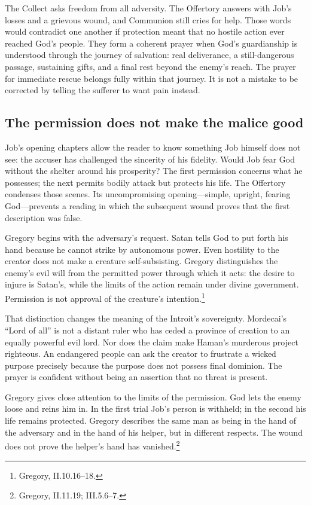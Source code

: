 
The Collect asks freedom from all adversity. The Offertory answers with
Job's losses and a grievous wound, and Communion still cries for help.
Those words would contradict one another if protection meant that no
hostile action ever reached God's people. They form a coherent prayer
when God's guardianship is understood through the journey of salvation:
real deliverance, a still-dangerous passage, sustaining gifts, and a
final rest beyond the enemy's reach. The prayer for immediate rescue
belongs fully within that journey. It is not a mistake to be corrected
by telling the sufferer to want pain instead.

\subsection{The permission does not make the malice good}
Job's opening chapters allow the reader to know something Job himself
does not see: the accuser has challenged the sincerity of his fidelity.
Would Job fear God without the shelter around his prosperity? The first
permission concerns what he possesses; the next permits bodily attack
but protects his life. The Offertory condenses those scenes. Its
uncompromising opening---simple, upright, fearing God---prevents a
reading in which the subsequent wound proves that the first description
was false.

Gregory begins with the adversary's request. Satan tells God to put
forth his hand because he cannot strike by autonomous power. Even
hostility to the creator does not make a creature self-subsisting.
Gregory distinguishes the enemy's evil will from the permitted power
through which it acts: the desire to injure is Satan's, while the
limits of the action remain under divine government. Permission is
not approval of the creature's intention.\footnote{Gregory,
 II.10.16--18.}

That distinction changes the meaning of the Introit's sovereignty.
Mordecai's ``Lord of all'' is not a distant ruler who has ceded a
province of creation to an equally powerful evil lord. Nor does the
claim make Haman's murderous project righteous. An endangered people
can ask the creator to frustrate a wicked purpose precisely because
the purpose does not possess final dominion. The prayer is confident
without being an assertion that no threat is present.

Gregory gives close attention to the limits of the permission. God
lets the enemy loose and reins him in. In the first trial Job's person
is withheld; in the second his life remains protected. Gregory
describes the same man as being in the hand of the adversary and in
the hand of his helper, but in different respects. The wound does
not prove the helper's hand has vanished.\footnote{Gregory,
 II.11.19; III.5.6--7.}

